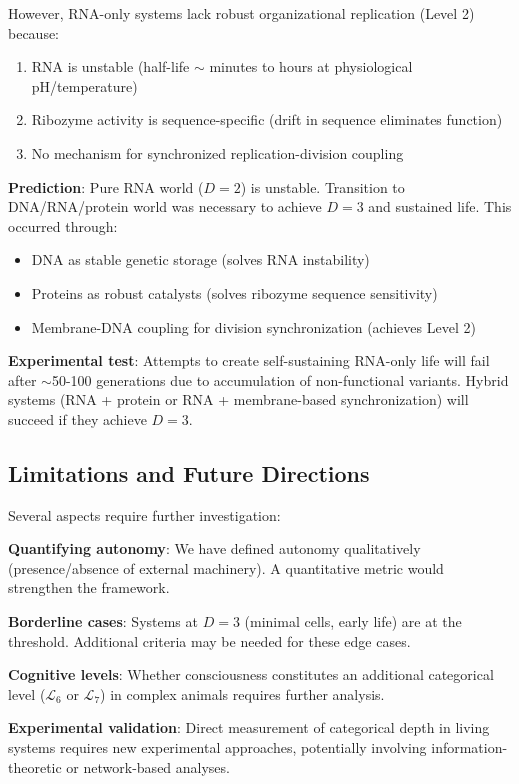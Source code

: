 \documentclass[11pt]{article}
\begin{document}
However, RNA-only systems lack robust organizational replication (Level 2) because:
\begin{enumerate}
\item RNA is unstable (half-life $\sim$ minutes to hours at physiological pH/temperature)
\item Ribozyme activity is sequence-specific (drift in sequence eliminates function)
\item No mechanism for synchronized replication-division coupling
\end{enumerate}

\textbf{Prediction}: Pure RNA world ($D = 2$) is unstable. Transition to DNA/RNA/protein world was necessary to achieve $D = 3$ and sustained life. This occurred through:
\begin{itemize}
\item DNA as stable genetic storage (solves RNA instability)
\item Proteins as robust catalysts (solves ribozyme sequence sensitivity)
\item Membrane-DNA coupling for division synchronization (achieves Level 2)
\end{itemize}

\textbf{Experimental test}: Attempts to create self-sustaining RNA-only life will fail after $\sim$50-100 generations due to accumulation of non-functional variants. Hybrid systems (RNA + protein or RNA + membrane-based synchronization) will succeed if they achieve $D = 3$.

\subsection{Limitations and Future Directions}

Several aspects require further investigation:

\textbf{Quantifying autonomy}: We have defined autonomy qualitatively (presence/absence of external machinery). A quantitative metric would strengthen the framework.

\textbf{Borderline cases}: Systems at $D = 3$ (minimal cells, early life) are at the threshold. Additional criteria may be needed for these edge cases.

\textbf{Cognitive levels}: Whether consciousness constitutes an additional categorical level ($\mathcal{L}_6$ or $\mathcal{L}_7$) in complex animals requires further analysis.

\textbf{Experimental validation}: Direct measurement of categorical depth in living systems requires new experimental approaches, potentially involving information-theoretic or network-based analyses.
\end{document}
